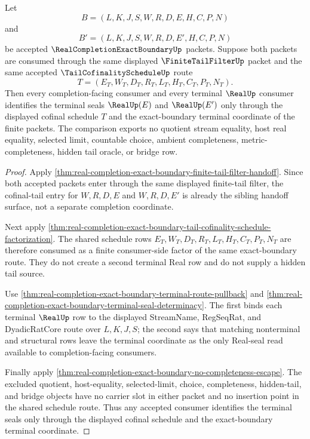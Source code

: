 \begin{theorem}
\label{thm:real-completion-exact-boundary-cofinal-terminal-determinacy}
Let
$$
B=(L,K,J,S,W,R,D,E,H,C,P,N)
$$
and
$$
B'=(L,K,J,S,W,R,D,E',H,C,P,N)
$$
be accepted $\RealCompletionExactBoundaryUp$ packets. Suppose both packets are consumed through the same displayed $\FiniteTailFilterUp$ packet and the same accepted $\TailCofinalityScheduleUp$ route
$$
T=(E_T,W_T,D_T,R_T,L_T,H_T,C_T,P_T,N_T).
$$
Then every completion-facing consumer and every terminal $\RealUp$ consumer identifies the terminal seals $\RealUp(E)$ and $\RealUp(E')$ only through the displayed cofinal schedule $T$ and the exact-boundary terminal coordinate of the finite packets. The comparison exports no quotient stream equality, host real equality, selected limit, countable choice, ambient completeness, metric-completeness, hidden tail oracle, or bridge row.
\end{theorem}
\begin{proof}
Apply \autoref{thm:real-completion-exact-boundary-finite-tail-filter-handoff}. Since both accepted packets enter through the same displayed finite-tail filter, the cofinal-tail entry for $W,R,D,E$ and $W,R,D,E'$ is already the sibling handoff surface, not a separate completion coordinate.

Next apply \autoref{thm:real-completion-exact-boundary-tail-cofinality-schedule-factorization}. The shared schedule rows $E_T,W_T,D_T,R_T,L_T,H_T,C_T,P_T,N_T$ are therefore consumed as a finite consumer-side factor of the same exact-boundary route. They do not create a second terminal Real row and do not supply a hidden tail source.

Use \autoref{thm:real-completion-exact-boundary-terminal-route-pullback} and \autoref{thm:real-completion-exact-boundary-terminal-seal-determinacy}. The first binds each terminal $\RealUp$ row to the displayed StreamName, RegSeqRat, and DyadicRatCore route over $L,K,J,S$; the second says that matching nonterminal and structural rows leave the terminal coordinate as the only Real-seal read available to completion-facing consumers.

Finally apply \autoref{thm:real-completion-exact-boundary-no-completeness-escape}. The excluded quotient, host-equality, selected-limit, choice, completeness, hidden-tail, and bridge objects have no carrier slot in either packet and no insertion point in the shared schedule route. Thus any accepted consumer identifies the terminal seals only through the displayed cofinal schedule and the exact-boundary terminal coordinate.
\end{proof}

